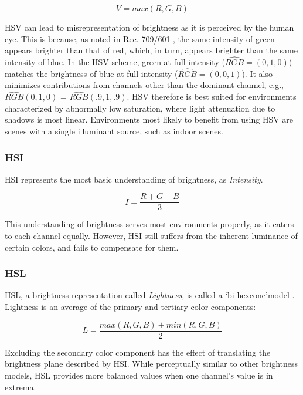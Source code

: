 \begin{equation}
V = max(R, G, B)
\label{eqn:hsv}
\end{equation}

HSV can lead to misrepresentation of brightness as it is perceived by the human eye. This is because, as noted in Rec. 709/601 \cite{bt709, bt601}, the same intensity of green appears brighter than that of red, which, in turn, appears brighter than the same intensity of blue. In the HSV scheme, green at full intensity ($\hat{RGB} = (0, 1, 0)$) matches the brightness of blue at full intensity ($\hat{RGB} = (0, 0, 1)$). It also minimizes contributions from channels other than the dominant channel, e.g., $\hat{RGB}(0, 1, 0)$ = $\hat{RGB}(.9, 1, .9)$. HSV therefore is best suited for environments characterized by abnormally low saturation, where light attenuation due to shadows is most linear. Environments most likely to benefit from using HSV are scenes with a single illuminant source, such as indoor scenes.

\subsubsection{HSI}

HSI represents the most basic understanding of brightness, as \textit{Intensity}. 

\begin{equation}
I = \dfrac{R + G + B}{3}
\end{equation}

This understanding of brightness serves most environments properly, as it caters to each channel equally. However, HSI still suffers from the inherent luminance of certain colors, and fails to compensate for them.

\subsubsection{HSL}

HSL, a brightness representation called \textit{Lightness}, is called a \lq{bi-hexcone}\rq model \cite{smith1978color}. Lightness is an average of the primary and tertiary color components:

\begin{equation}
L = \dfrac{max(R,G,B) + min(R,G,B)}{2}
\end{equation}

Excluding the secondary color component has the effect of translating the brightness plane described by HSI. While perceptually similar to other brightness models, HSL provides more balanced values when one channel's value is in extrema.

